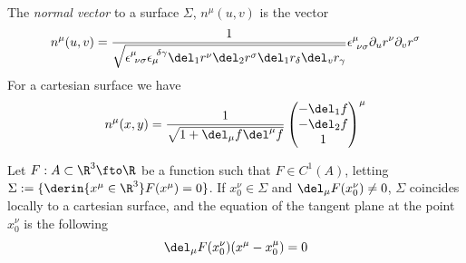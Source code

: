 \documentclass[../mmf.tex]{subfiles}
\begin{document}
\begin{dfn}
	The \textit{normal vector} to a surface $\Sigma$, $n^\mu(u,v)$ is the vector
	\begin{equation}
		n^\mu(u,v)=\frac{1}{\sqrt{\epsilon^\mu_{\ \nu\sigma}\epsilon_\mu^{\ \delta\gamma}\del_1r^\nu\del_2r^\sigma\del_1r_\delta\del_vr_\gamma}}\epsilon^\mu_{\ \nu\sigma}\partial_ur^\nu\partial_vr^\sigma
		\label{eq:normalsurf}
	\end{equation}
	For a cartesian surface we have
	\begin{equation}
		n^\mu(x,y)=\frac{1}{\sqrt{1+\del_\mu f\del^\mu f}}\begin{pmatrix}-\del_1f\\-\del_2f\\1\end{pmatrix}^\mu
		\label{eq:cartsurfnorm}
	\end{equation}
\end{dfn}
\begin{dfn}
	Let $F:A\subset\R^3\fto\R$ be a function such that $F\in C^1(A)$, letting $\Sigma:=\{\derin{x^\mu\in\R^3}F(x^\mu)=0\}$. If $x^\nu_0\in\Sigma$ and $\del_\mu F(x^\nu_0)\ne0$, $\Sigma$ coincides locally to a cartesian surface, and the equation of the tangent plane at the point $x^\nu_0$ is the following
	\begin{equation}
		\del_\mu F(x^\nu_0)(x^\mu-x_0^\mu)=0
		\label{eq:tangentimplicitplan}
	\end{equation}
\end{dfn}
\end{document}
